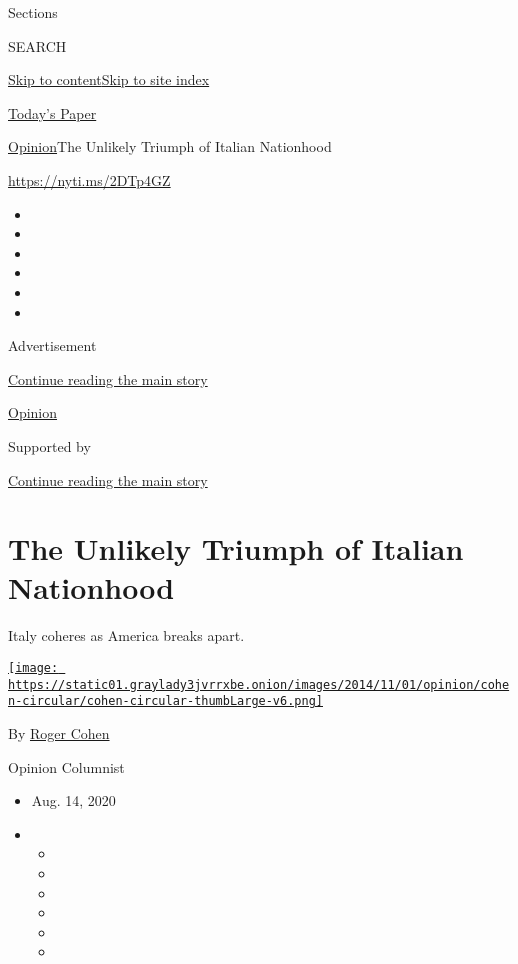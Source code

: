 Sections

SEARCH

\protect\hyperlink{site-content}{Skip to
content}\protect\hyperlink{site-index}{Skip to site index}

\href{https://myaccount.nytimes3xbfgragh.onion/auth/login?response_type=cookie\&client_id=vi}{}

\href{https://www.nytimes3xbfgragh.onion/section/todayspaper}{Today's
Paper}

\href{/section/opinion}{Opinion}\textbar{}The Unlikely Triumph of
Italian Nationhood

\url{https://nyti.ms/2DTp4GZ}

\begin{itemize}
\item
\item
\item
\item
\item
\item
\end{itemize}

Advertisement

\protect\hyperlink{after-top}{Continue reading the main story}

\href{/section/opinion}{Opinion}

Supported by

\protect\hyperlink{after-sponsor}{Continue reading the main story}

\hypertarget{the-unlikely-triumph-of-italian-nationhood}{%
\section{The Unlikely Triumph of Italian
Nationhood}\label{the-unlikely-triumph-of-italian-nationhood}}

Italy coheres as America breaks apart.

\href{https://www.nytimes3xbfgragh.onion/by/roger-cohen}{\texttt{[image: https://static01.graylady3jvrrxbe.onion/images/2014/11/01/opinion/cohen-circular/cohen-circular-thumbLarge-v6.png]}}

By \href{https://www.nytimes3xbfgragh.onion/by/roger-cohen}{Roger Cohen}

Opinion Columnist

\begin{itemize}
\item
  Aug. 14, 2020
\item
  \begin{itemize}
  \item
  \item
  \item
  \item
  \item
  \item
  \end{itemize}
\end{itemize}


